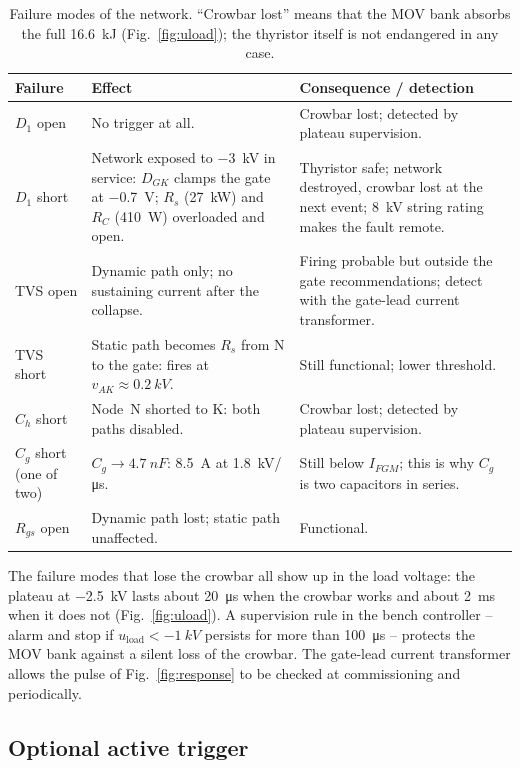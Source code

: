 \documentclass[11pt,a4paper]{article}
\begin{document}
\begin{table}[htbp]
\centering
\caption{Failure modes of the network. ``Crowbar lost'' means that the MOV bank absorbs the
full \SI{16.6}{kJ} (Fig.~\ref{fig:uload}); the thyristor itself is not endangered in any case.}
\label{tab:fmea}
\begin{tabular}{@{}lp{6.2cm}p{5.4cm}@{}}
\toprule
Failure & Effect & Consequence / detection \\
\midrule
$D_1$ open & No trigger at all. & Crowbar lost; detected by plateau supervision. \\
$D_1$ short & Network exposed to \SI{-3}{kV} in service: $D_{GK}$ clamps the gate at
   \SI{-0.7}{V}; $R_s$ (\SI{27}{kW}) and $R_C$ (\SI{410}{W}) overloaded and open. & Thyristor
   safe; network destroyed, crowbar lost at the next event; \SI{8}{kV} string rating makes the
   fault remote. \\
TVS open & Dynamic path only; no sustaining current after the collapse. & Firing probable but
   outside the gate recommendations; detect with the gate-lead current transformer. \\
TVS short & Static path becomes $R_s$ from N to the gate: fires at $v_{AK} \approx \SI{0.2}{kV}$. &
   Still functional; lower threshold. \\
$C_h$ short & Node~N shorted to K: both paths disabled. & Crowbar lost; detected by plateau supervision. \\
$C_g$ short (one of two) & $C_g \to \SI{4.7}{nF}$: \SI{8.5}{A} at \SI{1.8}{kV/\micro s}. & Still
   below $I_{FGM}$; this is why $C_g$ is two capacitors in series. \\
$R_{gs}$ open & Dynamic path lost; static path unaffected. & Functional. \\
\bottomrule
\end{tabular}
\end{table}

The failure modes that lose the crowbar all show up in the load voltage: the plateau at
\SI{-2.5}{kV} lasts about \SI{20}{\micro s} when the crowbar works and about \SI{2}{ms} when it
does not (Fig.~\ref{fig:uload}). A supervision rule in the bench controller -- alarm and stop
if $u_{\mathrm{load}} < \SI{-1}{kV}$ persists for more than \SI{100}{\micro s} -- protects the MOV
bank against a silent loss of the crowbar. The gate-lead current transformer allows the pulse
of Fig.~\ref{fig:response} to be checked at commissioning and periodically.

\subsection{Optional active trigger}
\end{document}
